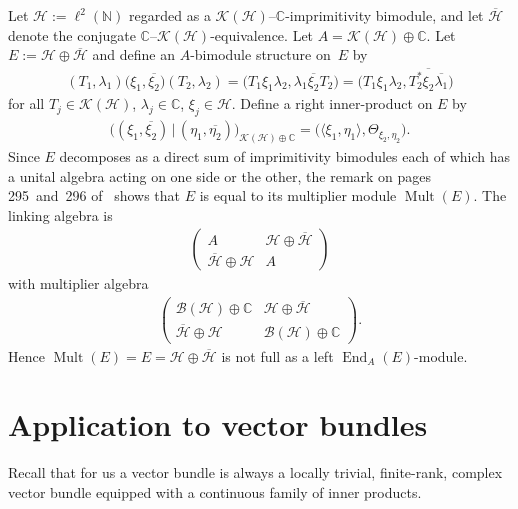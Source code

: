 \documentclass[10pt,a4paper]{amsart}
\numberwithin{equation}{section}
\DeclareMathOperator{\End}{End} %
\DeclareMathOperator{\Mult}{Mult} %
\newcommand{\C}{\mathbb{C}} %
\renewcommand{\H}{\mathcal{H}} %
\newcommand{\K}{\mathcal{K}} %
\newcommand{\N}{\mathbb{N}} %
\newcommand{\ol}[1]{\overline{#1}} %
\begin{document}
\begin{Example}Let $\H := \ell^2(\N)$ regarded as a $\K(\H)$--$\C$-imprimitivity bimodule, and let $\overline{\H}$ denote the conjugate $\C$--$\K(\H)$-equivalence. Let $A = \K(\H) \oplus \C$. Let $E := \H \oplus \overline{\H}$ and def\/ine an $A$-bi\-module structure on~$E$ by
\begin{gather*}
(T_1,\lambda_1)\big(\xi_1,\ol{\xi_2}\big)(T_2,\lambda_2)=\big(T_1\xi_1 \lambda_2, \lambda_1\ol{\xi_2}T_2\big)
=\big(T_1\xi_1 \lambda_2, \ol{T_2^*\xi_2\ol{\lambda_1}}\big)
\end{gather*}
for all $T_j\in \K(\H)$, $\lambda_j\in \C$, $\xi_j\in\H$. Def\/ine a right inner-product on $E$ by
\begin{gather*}
\big((\xi_1, \ol{\xi_2}) \,|\, (\eta_1, \ol{\eta_2})\big)_{\K(\H) \oplus \C} = \big(\langle \xi_1, \eta_1\rangle,\Theta_{\xi_2, \eta_2}\big).
\end{gather*}
Since $E$ decomposes as a direct sum of imprimitivity bimodules each of which has a unital algebra acting on one side or the other, the remark on pages 295~and~296 of~\cite{ER} shows that $E$ is equal to its multiplier module $\Mult(E)$. The linking algebra is
\begin{gather*}
\begin{pmatrix} A & \H\oplus\ol{\H}\\ \overline{\H}\oplus\H & A\end{pmatrix}
\end{gather*}
with multiplier algebra
\begin{gather*}
\begin{pmatrix} \mathcal{B}(\H)\oplus\C & \H\oplus\ol{\H}\\
\overline{\H}\oplus\H & \mathcal{B}(\H)\oplus\C\end{pmatrix}.
\end{gather*}
Hence $\Mult(E)=E=\H\oplus\ol{\H}$ is not full as a left $\End_A(E)$-module.
\end{Example}

\section{Application to vector bundles}

Recall that for us a vector bundle is always a locally trivial, f\/inite-rank, complex vector bundle equipped with a continuous family of inner products.
\end{document}
